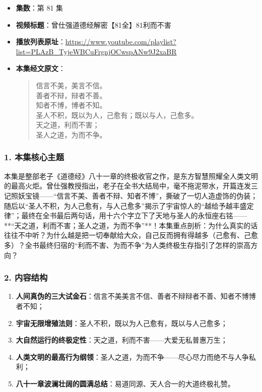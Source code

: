 \begin{itemize}
    \item \textbf{集数}：第 81 集
    \item \textbf{视频标题}：曾仕强道德经解密【81全】81利而不害
    \item \textbf{播放列表原址}：\url{https://www.youtube.com/playlist?list=PLAzB_TyjeWBCuFrgnjOCwspANw9J2xaBR}
    \item \textbf{本集经文原文}：
    \begin{quote}\kaishu
    信言不美，美言不信。\\
    善者不辩，辩者不善。\\
    知者不博，博者不知。\\
    圣人不积，既以为人，己愈有；既以与人，己愈多。\\
    天之道，利而不害；\\
    圣人之道，为而不争。
    \end{quote}
\end{itemize}

\subsubsection{1. 本集核心主题}
本集是整部老子《道德经》八十一章的终极收官之作，是东方智慧照耀全人类文明的最高火炬。曾仕强教授指出，老子在全书大结局中，毫不拖泥带水，开篇连发三记照妖宝镜——“信言不美、善者不辩、知者不博”，撕破了一切人造虚饰的伪装；随后以“圣人不积，为人己愈有，与人己愈多”揭示了宇宙惊人的“越给予越丰盛定律”；最终在全书最后两句话，用十六个字立下了天地与圣人的永恒座右铭——**“天之道，利而不害；圣人之道，为而不争”**！本集重点剖析：为什么真实的话往往不中听？为什么越是把一切奉献给大众，自己反而拥有得越多（己愈有、己愈多）？全书最终归宿的“利而不害、为而不争”为人类终极生存指引了怎样的崇高方向？

\subsubsection{2. 内容结构}
\begin{enumerate}
    \item \textbf{人间真伪的三大试金石}：信言不美美言不信、善者不辩辩者不善、知者不博博者不知；
    \item \textbf{宇宙无限增殖法则}：圣人不积，既以为人己愈有，既以与人己愈多；
    \item \textbf{大自然运行的终极定性}：天之道，利而不害——大爱无私普惠万生；
    \item \textbf{人类文明的最高行为纲领}：圣人之道，为而不争——尽心尽力而绝不与人争私利；
    \item \textbf{八十一章波澜壮阔的圆满总结}：易道同源、天人合一的大道终极礼赞。
\end{enumerate}

